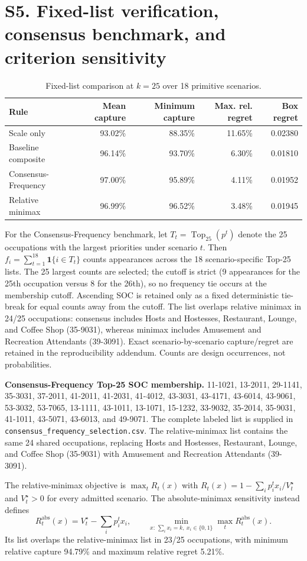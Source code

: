 \documentclass[10pt]{article}
\newcommand{\ind}{\mathbf{1}}
\begin{document}
\section*{S5. Fixed-list verification, consensus benchmark, and criterion sensitivity}
\begin{table}[h]\centering\small
\caption{Fixed-list comparison at $k=25$ over 18 primitive scenarios.}
\begin{tabular}{lrrrr}\toprule Rule&Mean capture&Minimum capture&Max. rel. regret&Box regret\\\midrule
Scale only&93.02\%&88.35\%&11.65\%&0.02380\\
Baseline composite&96.14\%&93.70\%&6.30\%&0.01810\\
Consensus-Frequency&97.00\%&95.89\%&4.11\%&0.01952\\
Relative minimax&96.99\%&96.52\%&3.48\%&0.01945\\\bottomrule\end{tabular}
\end{table}
For the Consensus-Frequency benchmark, let $T_t=\operatorname{Top}_{25}(p^t)$ denote the 25 occupations with the largest priorities under scenario $t$. Then $f_i=\sum_{t=1}^{18}\ind\{i\in T_t\}$ counts appearances across the 18 scenario-specific Top-25 lists. The 25 largest counts are selected; the cutoff is strict (9 appearances for the 25th occupation versus 8 for the 26th), so no frequency tie occurs at the membership cutoff. Ascending SOC is retained only as a fixed deterministic tie-break for equal counts away from the cutoff. The list overlaps relative minimax in 24/25 occupations: consensus includes Hosts and Hostesses, Restaurant, Lounge, and Coffee Shop (35-9031), whereas minimax includes Amusement and Recreation Attendants (39-3091). Exact scenario-by-scenario capture/regret are retained in the reproducibility addendum. Counts are design occurrences, not probabilities.

\noindent\textbf{Consensus-Frequency Top-25 SOC membership.} 11-1021, 13-2011, 29-1141, 35-3031, 37-2011, 41-2011, 41-2031, 41-4012, 43-3031, 43-4171, 43-6014, 43-9061, 53-3032, 53-7065, 13-1111, 43-1011, 13-1071, 15-1232, 33-9032, 35-2014, 35-9031, 41-1011, 43-5071, 43-6013, and 49-9071. The complete labeled list is supplied in \texttt{consensus\_frequency\_selection.csv}. The relative-minimax list contains the same 24 shared occupations, replacing Hosts and Hostesses, Restaurant, Lounge, and Coffee Shop (35-9031) with Amusement and Recreation Attendants (39-3091).

The relative-minimax objective is $\max_t R_t(x)$ with $R_t(x)=1-\sum_i p_i^t x_i/V_t^\star$ and $V_t^\star>0$ for every admitted scenario. The absolute-minimax sensitivity instead defines
\[R_t^{\mathrm{abs}}(x)=V_t^\star-\sum_i p_i^t x_i,\qquad \min_{x:\,\sum_i x_i=k,\ x_i\in\{0,1\}}\max_tR_t^{\mathrm{abs}}(x).\]
Its list overlaps the relative-minimax list in 23/25 occupations, with minimum relative capture 94.79\% and maximum relative regret 5.21\%.
\end{document}
